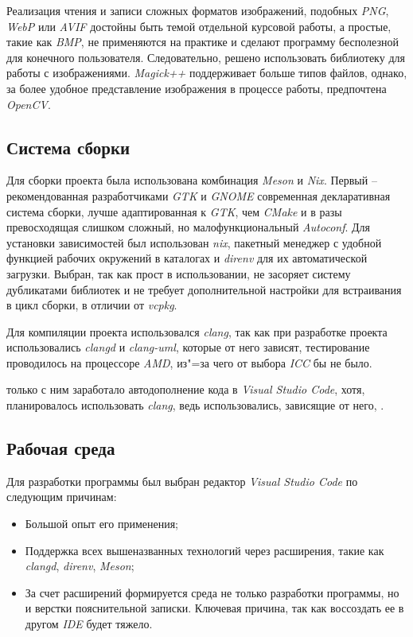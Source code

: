Реализация чтения и записи сложных форматов изображений, подобных \textit{PNG},
\textit{WebP} или \textit{AVIF} достойны быть темой отдельной курсовой работы, а
простые, такие как \textit{BMP}, не применяются на практике и сделают программу
бесполезной для конечного пользователя. Следовательно, решено использовать
библиотеку для работы с изображениями. \textit{Magick++} поддерживает больше
типов файлов, однако, за более удобное представление изображения в процессе
работы, предпочтена \textit{OpenCV}.

\subsection{Система сборки}
Для сборки проекта была использована комбинация \textit{Meson} и \textit{Nix}.
Первый -- рекомендованная разработчиками \textit{GTK} и \textit{GNOME}
современная декларативная система сборки, лучше адаптированная к \textit{GTK},
чем \textit{CMake} и в разы превосходящая слишком сложный, но малофункциональный
\textit{Autoconf}. Для установки зависимостей был использован \textit{nix},
пакетный менеджер с удобной функцией рабочих окружений в каталогах и
\textit{direnv} для их автоматической загрузки. Выбран, так как прост в
использовании, не засоряет систему дубликатами библиотек и не требует
дополнительной настройки для встраивания в цикл сборки, в отличии от
\textit{vcpkg}.

Для компиляции проекта использовался \textit{clang}, так как при разработке
проекта использовались \textit{clangd} и \textit{clang-uml}, которые от него
зависят, тестирование проводилось на процессоре \textit{AMD}, из"=за чего от
выбора \textit{ICC} бы не было.

только с ним заработало автодополнение кода в
\textit{Visual Studio Code}, хотя, планировалось использовать \textit{clang},
ведь использовались, зависящие от него, .

\subsection{Рабочая среда}
Для разработки программы был выбран редактор \textit{Visual Studio Code} по
следующим причинам:

\begin{itemize}
    \item Большой опыт его применения;
    \item Поддержка всех вышеназванных технологий через расширения, такие как
          \textit{clangd}, \textit{direnv}, \textit{Meson};
    \item За счет расширений формируется среда не только разработки программы,
          но и верстки пояснительной записки. Ключевая причина, так как
          воссоздать ее в другом \textit{IDE} будет тяжело.
\end{itemize}

